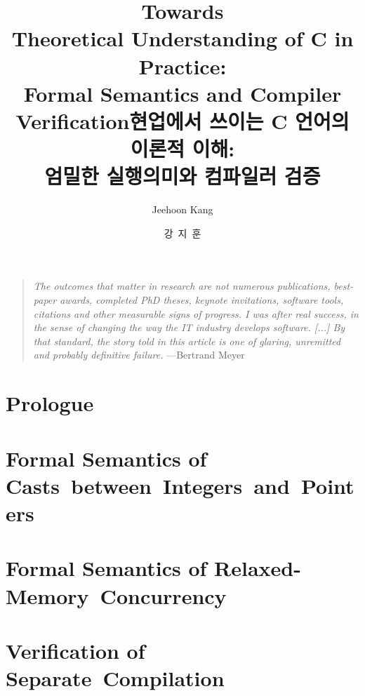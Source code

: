 \documentclass[oneside,phd]{snuthesis}
\title{Towards \\ Theoretical Understanding of C in Practice: \\ Formal Semantics and Compiler Verification}
\title*{현업에서 쓰이는 C 언어의 이론적 이해: \\ 엄밀한 실행의미와 컴파일러 검증}
\author{Jeehoon Kang}
\author*{강~지~훈} %
\begin{document}
\makefrontcover
\makefrontcover
\makeapproval

\cleardoublepage
{}



\begin{quotation}
  \emph{The outcomes that matter in research are not numerous publications, best-paper awards,
    completed PhD theses, keynote invitations, software tools, citations and other measurable signs
    of progress.  I was after real success, in the sense of changing the way the IT industry
    develops software. [...] By that standard, the story told in this article is one of glaring,
    unremitted and probably definitive failure.} \hfill{}---Bertrand Meyer~\cite{bertrand-meyer}\ \phantom{ }
\end{quotation}



\tableofcontents
\listoffigures

\cleardoublepage
{}


\chapter{Prologue}
\label{chap:prologue}




\chapter{Formal Semantics of Casts~between~Integers~and~Pointers}
\label{chap:intptrcast}







\chapter{Formal Semantics of Relaxed-Memory~Concurrency}
\label{chap:relaxed}






% 




\chapter{Verification of Separate~Compilation}
\label{chap:sepcomp}
\end{document}
